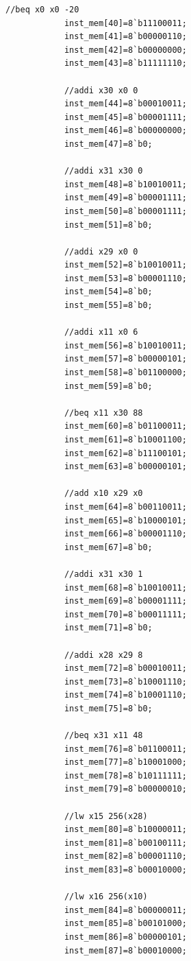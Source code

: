 \documentclass{article}
\begin{document}
\begin{lstlisting}[caption={Changes to Instruction Memory}, captionpos=b, language=RISC-V]
            //beq x0 x0 -20
            inst_mem[40]=8`b11100011;
            inst_mem[41]=8`b00000110;
            inst_mem[42]=8`b00000000;
            inst_mem[43]=8`b11111110;
            
            //addi x30 x0 0
            inst_mem[44]=8`b00010011;
            inst_mem[45]=8`b00001111;
            inst_mem[46]=8`b00000000;
            inst_mem[47]=8`b0;
            
            //addi x31 x30 0
            inst_mem[48]=8`b10010011;
            inst_mem[49]=8`b00001111;
            inst_mem[50]=8`b00001111;
            inst_mem[51]=8`b0;
            
            //addi x29 x0 0
            inst_mem[52]=8`b10010011;
            inst_mem[53]=8`b00001110;
            inst_mem[54]=8`b0;
            inst_mem[55]=8`b0;
            
            //addi x11 x0 6
            inst_mem[56]=8`b10010011;
            inst_mem[57]=8`b00000101;
            inst_mem[58]=8`b01100000;
            inst_mem[59]=8`b0;
            
            //beq x11 x30 88
            inst_mem[60]=8`b01100011;
            inst_mem[61]=8`b10001100;
            inst_mem[62]=8`b11100101;
            inst_mem[63]=8`b00000101;
            
            //add x10 x29 x0
            inst_mem[64]=8`b00110011;
            inst_mem[65]=8`b10000101;
            inst_mem[66]=8`b00001110;
            inst_mem[67]=8`b0;
            
            //addi x31 x30 1
            inst_mem[68]=8`b10010011;
            inst_mem[69]=8`b00001111;
            inst_mem[70]=8`b00011111;
            inst_mem[71]=8`b0;
            
            //addi x28 x29 8
            inst_mem[72]=8`b00010011;
            inst_mem[73]=8`b10001110;
            inst_mem[74]=8`b10001110;
            inst_mem[75]=8`b0;
            
            //beq x31 x11 48
            inst_mem[76]=8`b01100011;
            inst_mem[77]=8`b10001000;
            inst_mem[78]=8`b10111111;
            inst_mem[79]=8`b00000010;
            
            //lw x15 256(x28)
            inst_mem[80]=8`b10000011;
            inst_mem[81]=8`b00100111;
            inst_mem[82]=8`b00001110;
            inst_mem[83]=8`b00010000;
            
            //lw x16 256(x10)
            inst_mem[84]=8`b00000011;
            inst_mem[85]=8`b00101000;
            inst_mem[86]=8`b00000101;
            inst_mem[87]=8`b00010000;
            

\end{lstlisting}
\end{document}
